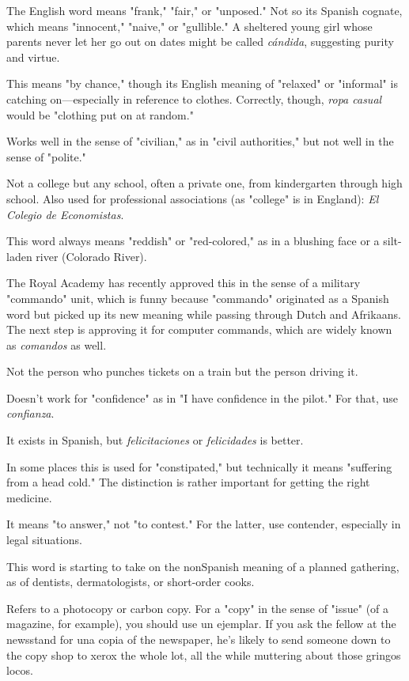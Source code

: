  The English word means "frank," "fair," or "unposed." Not so its Spanish cognate, which means "innocent," "naive,"
or "gullible." A sheltered young girl whose parents never let her go out
on dates might be called \emph{cándida}, suggesting purity and virtue.

 This means "by chance," though its English meaning of "relaxed" or "informal" is catching on---especially in reference
to clothes. Correctly, though, \emph{ropa casual} would be "clothing put on at
random."

 Works well in the sense of "civilian," as in "civil authorities," but not well in the sense of "polite."

 Not a college but any school, often a private one,
from kindergarten through high school. Also used for professional associations (as "college" is in England): \emph{El Colegio de Economistas}.

 This word always means "reddish" or "red-colored," as in a blushing face or a silt-laden river (Colorado River).

 The Royal Academy has recently approved this in
the sense of a military "commando" unit, which is funny because "commando" originated as a Spanish word but picked up its new meaning
while passing through Dutch and Afrikaans. The next step is approving it for computer commands, which are widely known as \emph{comandos}
as well.

 Not the person who punches tickets on a train
but the person driving it.

 Doesn't work for "confidence" as in "I have
confidence in the pilot." For that, use \emph{confianza}.

 It exists in Spanish, but \emph{felicitaciones}
or \emph{felicidades} is better.

 In some places this is used for "constipated,"
but technically it means "suffering from a head cold." The distinction
is rather important for getting the right medicine.

 It means "to answer," not "to contest." For the
latter, use contender, especially in legal situations.

 This word is starting to take on the nonSpanish meaning of a planned gathering, as of dentists, dermatologists, or short-order cooks.

 Refers to a photocopy or carbon copy. For a "copy" in
the sense of "issue" (of a magazine, for example), you should use un
ejemplar. If you ask the fellow at the newsstand for una copia of the
newspaper, he's likely to send someone down to the copy shop to
xerox the whole lot, all the while muttering about those gringos
locos.


